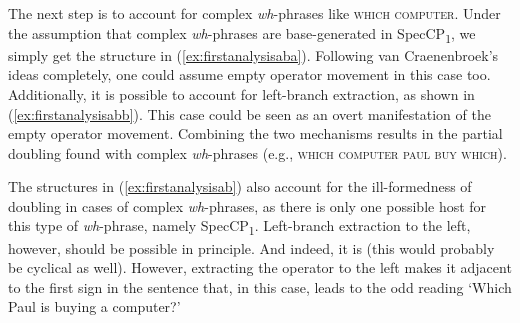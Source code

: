 \noindent The next step is to account for complex \textit{wh}-phrases like \textsc{which computer}. Under the assumption that complex \textit{wh}-phrases are base-generated in SpecCP\textsubscript{1}, we simply get the structure in (\ref{ex:firstanalysisaba}). Following van Craenenbroek's ideas completely, one could assume empty operator movement in this case too. Additionally, it is possible to account for left-branch extraction, as shown in (\ref{ex:firstanalysisabb}). This case could be seen as an overt manifestation of the empty operator movement. Combining the two mechanisms results in the partial doubling found with complex \textit{wh}-phrases (e.g., \textsc{which computer paul buy which}). %

The structures in (\ref{ex:firstanalysisab}) also account for the ill-formedness of doubling in cases of complex \textit{wh}-phrases, as there is only one possible host for this type of \textit{wh}-phrase, namely SpecCP\textsubscript{1}. Left-branch extraction to the left, however, should be possible in principle. And indeed, it is (this would probably be cyclical as well). However, extracting the operator to the left makes it adjacent to the first sign in the sentence that, in this case, leads to the odd reading `Which Paul is buying a computer?' 

\vspace{-0.5cm}

